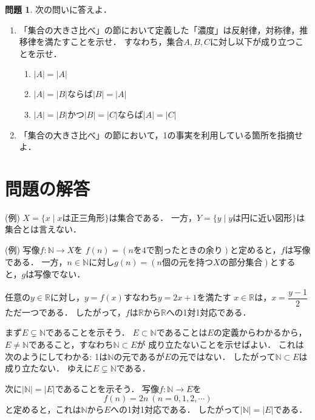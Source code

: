 ﻿\documentclass[./main]{subfiles} %
\theoremstyle{definition}
\newtheorem{hamadaqst}[hamadadefi]{問題}
\begin{document}
\begin{hamadaqst}
\label{cardiseq}
次の問いに答えよ．
\begin{enumerate}
\item 「集合の大きさ比べ」の節において定義した「濃度」は反射律，対称律，推移律を満たすことを示せ．
すなわち，集合$A,B,C$に対し以下が成り立つことを示せ．
\begin{enumerate}
\item $|A|=|A|$
\item $|A|=|B|$ならば$|B|=|A|$
\item $|A|=|B|$かつ$|B|=|C|$ならば$|A|=|C|$
\end{enumerate}
\item 「集合の大きさ比べ」の節において，1の事実を利用している箇所を指摘せよ．
\end{enumerate}
\end{hamadaqst}

\section{問題の解答}
(例)
$X=\{x\mid xは正三角形\}$は集合である．
一方，$Y=\{y\mid yは円に近い図形\}$は集合とは言えない．

(例)
写像$f\colon\mathbb{N}\to X$を
$f(n)=(nを4で割ったときの余り)$と定めると，$f$は写像である．
一方，$n\in\mathbb{N}$に対し$g(n)=(n個の元を持つXの部分集合)$とすると，$g$は写像でない．

任意の$y\in\mathbb{R}$に対し，$y=f(x)$すなわち$y=2x+1$を満たす
$x\in\mathbb{R}$は，$x=\dfrac{y-1}{2}$ただ一つである．
したがって，$f$は$\mathbb{R}$から$\mathbb{R}$への1対1対応である．

まず$E\subsetneq\mathbb{N}$であることを示そう．
$E\subset\mathbb{N}$であることは$E$の定義からわかるから，
$E\neq\mathbb{N}$であること，すなわち$\mathbb{N}\subset E$が
成り立たないことを示せばよい．
これは次のようにしてわかる:
1は$\mathbb{N}$の元であるが$E$の元ではない．
したがって$\mathbb{N}\subset E$は成り立たない．
ゆえに$E\subsetneq\mathbb{N}$である．

次に$|\mathbb{N}|=|E|$であることを示そう．
写像$f\colon\mathbb{N}\to E$を
\[
f(n)=2n\ (n=0,1,2,\cdots)
\]
と定めると，これは$\mathbb{N}$から$E$への1対1対応である．
したがって$|\mathbb{N}|=|E|$である．
\end{document}
